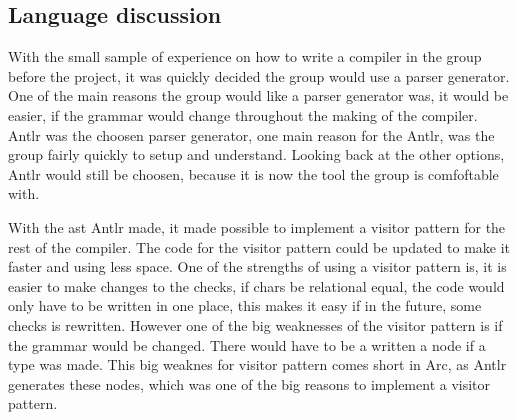 \subsection*{Language discussion}
With the small sample of experience on how to write a compiler in the group before the project, it was quickly decided the group would use a parser generator. One of the main reasons the group would like a parser generator was, it would be easier, if the grammar would change throughout the making of the compiler. Antlr was the choosen parser generator, one main reason for the Antlr, was the group fairly quickly to setup and understand. Looking back at the other options, Antlr would still be choosen, because it is now the tool the group is comfoftable with.

With the \gls{ast} Antlr made, it made possible to implement a visitor pattern for the rest of the compiler. The code for the visitor pattern could be updated to make it faster and using less space. One of the strengths of using a visitor pattern is, it is easier to make changes to the checks, if chars be relational equal, the code would only have to be written in one place, this makes it easy if in the future, some checks is rewritten. However one of the big weaknesses of the visitor pattern is if the grammar would be changed. There would have to be a written a node if a type was made. This big weaknes for visitor pattern comes short in Arc, as Antlr generates these nodes, which was one of the big reasons to implement a visitor pattern.

